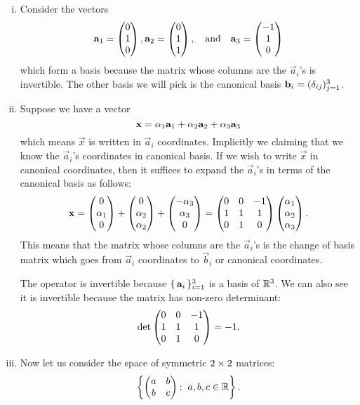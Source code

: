 \documentclass[12pt]{memoir}
\begin{document}
\begin{ptcbr}
    \begin{enumerate}[(i)]
        \item Consider the vectors 
        $$\mathbf{a}_1=\begin{pmatrix} 0 \\ 1 \\ 0 \end{pmatrix},\mathbf{a}_2=\begin{pmatrix} 0 \\ 1 \\ 1 \end{pmatrix},\quad\text{and}\quad\mathbf{a}_3=\begin{pmatrix} -1 \\ 1 \\ 0 \end{pmatrix}$$
        which form a basis because the matrix whose columns are the $\vec a_i$'s is invertible. The other basis we will pick is the canonical basis $\mathbf{b}_i=(\delta_{ij})_{j=1}^3$.
        \item Suppose we have a vector 
        $$\mathbf{x}=\alpha_1\mathbf{a}_1+\alpha_2\mathbf{a}_2+\alpha_3\mathbf{a}_3$$
        which means $\vec x$ is written in $\vec a_i$ coordinates. Implicitly we claiming that we know the $\vec a_i$'s coordinates in canonical basis. If we wish to write $\vec x$ in canonical coordinates, then it suffices to expand the $\vec a_i$'s in terms of the canonical basis as follows:
        $$\mathbf{x}=\begin{pmatrix} 0 \\ \alpha_1 \\ 0 \end{pmatrix}+\begin{pmatrix} 0 \\ \alpha_2 \\ \alpha_2 \end{pmatrix}+\begin{pmatrix} -\alpha_3 \\ \alpha_3 \\ 0 \end{pmatrix}=\begin{pmatrix} 0 & 0 & -1 \\ 1 & 1 & 1 \\ 0 & 1 & 0 \end{pmatrix}\begin{pmatrix} \alpha_1 \\ \alpha_2 \\ \alpha_3 \end{pmatrix}.$$
        This means that the matrix whose columns are the $\vec a_i$'s is the change of basis matrix which goes from $\vec a_i$ coordinates to $\vec b_i$ or canonical coordinates.\par 
        The operator is invertible because $\{\,\mathbf{a}_i\,\}_{i=1}^3$ is a basis of $\mathbb{R}^3$. We can also see it is invertible because the matrix has non-zero determinant:
        $$\det\begin{pmatrix} 0 & 0 & -1 \\ 1 & 1 & 1 \\ 0 & 1 & 0 \end{pmatrix}=-1.$$
        \item Now let us consider the space of symmetric $2\times2$ matrices:
        $$\left\lbrace\twobytwo{a}{b}{b}{c}\:\ a,b,c\in\bR\right\rbrace.$$
        
    \end{enumerate}
\end{ptcbr}
\end{document}
